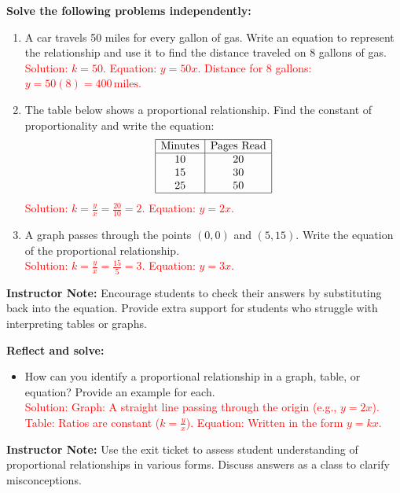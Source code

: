 \documentclass[12pt]{article}
\begin{document}
\begin{tcolorbox}[colframe=black!60, colback=white, 
coltitle=black, colbacktitle=black!15, fonttitle=\bfseries\Large, 
title=Independent Practice, halign title=center, left=10pt, right=10pt, top=10pt, bottom=15pt]
\textbf{Solve the following problems independently:}
\begin{enumerate}[itemsep=5em]
    \item A car travels 50 miles for every gallon of gas. Write an equation to represent the relationship and use it to find the distance traveled on 8 gallons of gas. \\
    \textcolor{red}{Solution: \(k = 50\). Equation: \(y = 50x\). Distance for 8 gallons: \(y = 50(8) = 400 \, \text{miles}\).}
    \item The table below shows a proportional relationship. Find the constant of proportionality and write the equation:
    \[
    \begin{array}{|c|c|}
    \hline
    \text{Minutes} & \text{Pages Read} \\
    \hline
    10 & 20 \\
    15 & 30 \\
    25 & 50 \\
    \hline
    \end{array}
    \] 
    \textcolor{red}{Solution: \(k = \frac{y}{x} = \frac{20}{10} = 2\). Equation: \(y = 2x\).}
    \item A graph passes through the points \((0, 0)\) and \((5, 15)\). Write the equation of the proportional relationship. \\
    \textcolor{red}{Solution: \(k = \frac{y}{x} = \frac{15}{5} = 3\). Equation: \(y = 3x\).}
\end{enumerate}

{\color{blue} \textbf{Instructor Note:} Encourage students to check their answers by substituting back into the equation. Provide extra support for students who struggle with interpreting tables or graphs.}
\end{tcolorbox}

\vspace{1em}

\begin{tcolorbox}[colframe=black!60, colback=white, 
coltitle=black, colbacktitle=black!15, fonttitle=\bfseries\Large, 
title=Exit Ticket, halign title=center, left=10pt, right=10pt, top=10pt, bottom=15pt]
\textbf{Reflect and solve:}
\begin{itemize}
    \item How can you identify a proportional relationship in a graph, table, or equation? Provide an example for each. \\
    \textcolor{red}{Solution: Graph: A straight line passing through the origin (e.g., \(y = 2x\)). Table: Ratios are constant (\(k = \frac{y}{x}\)). Equation: Written in the form \(y = kx\).}
\end{itemize}

{\color{blue} \textbf{Instructor Note:} Use the exit ticket to assess student understanding of proportional relationships in various forms. Discuss answers as a class to clarify misconceptions.}
\end{tcolorbox}
\end{document}
